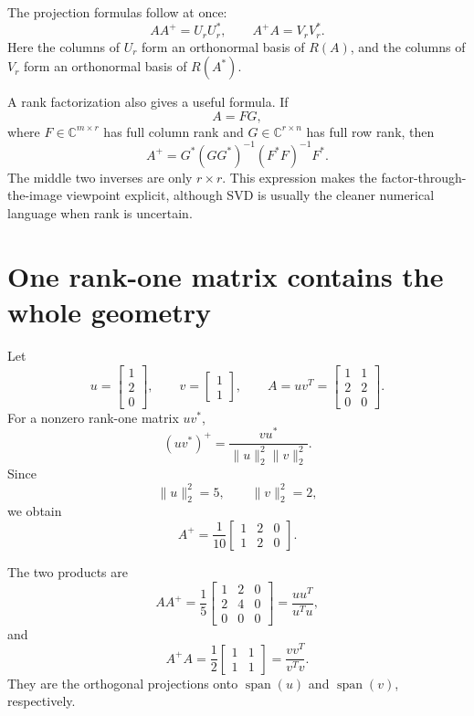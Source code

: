 The projection formulas follow at once:
\[
  AA^+=U_rU_r^*,
  \qquad
  A^+A=V_rV_r^*.
\]
Here the columns of \(U_r\) form an orthonormal basis of \(R(A)\), and the columns of \(V_r\) form an orthonormal basis of \(R(A^*)\).

A rank factorization also gives a useful formula.  If
\[
  A=FG,
\]
where \(F\in\mathbb C^{m\times r}\) has full column rank and \(G\in\mathbb C^{r\times n}\) has full row rank, then
\[
  A^+
  =G^*(GG^*)^{-1}(F^*F)^{-1}F^*.
\]
The middle two inverses are only \(r\times r\).  This expression makes the factor-through-the-image viewpoint explicit, although SVD is usually the cleaner numerical language when rank is uncertain.

\section{One rank-one matrix contains the whole geometry}

Let
\[
  u=
  \begin{bmatrix}1\\2\\0\end{bmatrix},
  \qquad
  v=
  \begin{bmatrix}1\\1\end{bmatrix},
  \qquad
  A=uv^T=
  \begin{bmatrix}
    1&1\\
    2&2\\
    0&0
  \end{bmatrix}.
\]
For a nonzero rank-one matrix \(uv^*\),
\[
  (uv^*)^+=\frac{vu^*}{\|u\|_2^2\|v\|_2^2}.
\]
Since
\[
  \|u\|_2^2=5,
  \qquad
  \|v\|_2^2=2,
\]
we obtain
\[
  A^+=\frac1{10}
  \begin{bmatrix}
    1&2&0\\
    1&2&0
  \end{bmatrix}.
\]

The two products are
\[
  AA^+=\frac15
  \begin{bmatrix}
    1&2&0\\
    2&4&0\\
    0&0&0
  \end{bmatrix}
  =\frac{uu^T}{u^Tu},
\]
and
\[
  A^+A=\frac12
  \begin{bmatrix}
    1&1\\
    1&1
  \end{bmatrix}
  =\frac{vv^T}{v^Tv}.
\]
They are the orthogonal projections onto \(\operatorname{span}(u)\) and \(\operatorname{span}(v)\), respectively.

